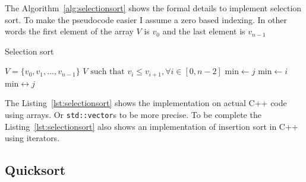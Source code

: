 The Algorithm~\ref{alg:selectionsort} shows the formal details to implement selection sort.
To make the pseudocode easier I assume a zero based indexing.
In other words the first element of the array $V$ is $v_0$ and the last element is $v_{n-1}$

\begin{algorithm}[H]
\caption{Selection sort}
\label{alg:selectionsort}
\begin{algorithmic}[1] %
\Require $V = \{ v_0, v_1, \ldots, v_{n-1} \} $ 
\Ensure $V\text{ such that } v_i \leq v_{i + 1}, \forall i \in [0, n-2]$ 
    \State $\text{min} \gets j$ 
     
            \State $\text{min} \gets i$
        \EndIf
    \EndFor
     
        \State $\text{min} \leftrightarrow j$ 
    \EndIf
\EndFor
\EndProcedure
\end{algorithmic}
\end{algorithm}

The Listing~\ref{lst:selectionsort} shows the implementation on actual C++ code using arrays. Or \texttt{std::vector}s to be more precise.
To be complete the Listing~\ref{lst:selectionsort} also shows an implementation of   insertion sort in C++ using iterators.


 
\subsection{Quicksort}


